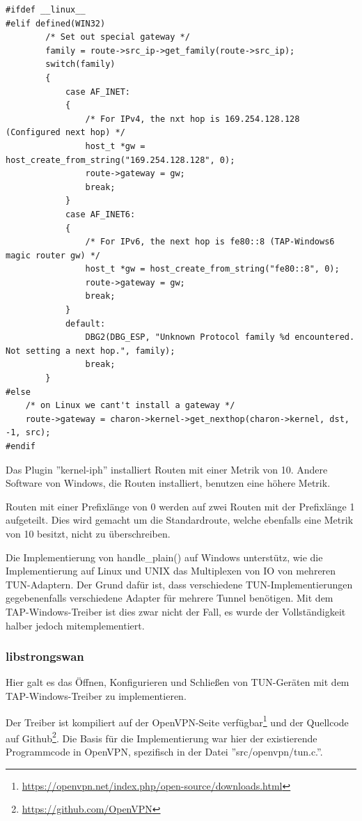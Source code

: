 {\begin{lstlisting}[caption=Patch für die Routen-Installation von libipsec]
#ifdef __linux__
#elif defined(WIN32)
        /* Set out special gateway */
        family = route->src_ip->get_family(route->src_ip);
        switch(family)
        {
            case AF_INET:
            {
                /* For IPv4, the nxt hop is 169.254.128.128 (Configured next hop) */
                host_t *gw = host_create_from_string("169.254.128.128", 0);
                route->gateway = gw;
                break;
            }
            case AF_INET6:
            {
                /* For IPv6, the next hop is fe80::8 (TAP-Windows6 magic router gw) */
                host_t *gw = host_create_from_string("fe80::8", 0);
                route->gateway = gw;
                break;
            }
            default:
                DBG2(DBG_ESP, "Unknown Protocol family %d encountered. Not setting a next hop.", family);
                break;
        }
#else
	/* on Linux we cant't install a gateway */
	route->gateway = charon->kernel->get_nexthop(charon->kernel, dst, -1, src);
#endif
\end{lstlisting}

Das Plugin ''kernel-iph'' installiert Routen mit einer Metrik von 10.
Andere Software von Windows, die Routen installiert, benutzen eine höhere Metrik.

Routen mit einer Prefixlänge von 0 werden auf zwei Routen mit der Prefixlänge 1 aufgeteilt.
Dies wird gemacht um die Standardroute, welche ebenfalls eine Metrik von 10 besitzt,
nicht zu überschreiben.

Die Implementierung von handle\_plain() auf Windows unterstütz, wie die Implementierung
auf Linux und UNIX das Multiplexen von IO von mehreren TUN-Adaptern. Der Grund dafür ist,
dass verschiedene TUN-Implementierungen gegebenenfalls verschiedene Adapter für mehrere Tunnel
benötigen. Mit dem TAP-Windows-Treiber ist dies zwar nicht der Fall, es wurde der Vollständigkeit
halber jedoch mitemplementiert.

\subsubsection{libstrongswan}
Hier galt es das Öffnen, Konfigurieren und Schließen von TUN-Geräten
mit dem TAP-Windows-Treiber zu implementieren.

Der Treiber ist kompiliert auf der OpenVPN-Seite
verfügbar\footnote{\url{https://openvpn.net/index.php/open-source/downloads.html}}
und der Quellcode auf Github\footnote{\url{https://github.com/OpenVPN}}.
Die Basis für die Implementierung war hier der existierende Programmcode in
OpenVPN, spezifisch in  der Datei ''src/openvpn/tun.c.''.

}
